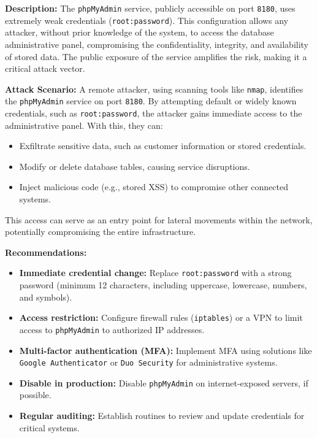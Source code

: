 \documentclass[a4paper,12pt]{article}
\begin{document}
\textbf{Description:}  
The \texttt{phpMyAdmin} service, publicly accessible on port \texttt{8180}, uses extremely weak credentials (\texttt{root:password}). This configuration allows any attacker, without prior knowledge of the system, to access the database administrative panel, compromising the confidentiality, integrity, and availability of stored data. The public exposure of the service amplifies the risk, making it a critical attack vector.

\textbf{Attack Scenario:}  
A remote attacker, using scanning tools like \texttt{nmap}, identifies the \texttt{phpMyAdmin} service on port \texttt{8180}. By attempting default or widely known credentials, such as \texttt{root:password}, the attacker gains immediate access to the administrative panel. With this, they can:  
\begin{itemize}
    \item Exfiltrate sensitive data, such as customer information or stored credentials.  
    \item Modify or delete database tables, causing service disruptions.  
    \item Inject malicious code (e.g., stored XSS) to compromise other connected systems.  
\end{itemize}
This access can serve as an entry point for lateral movements within the network, potentially compromising the entire infrastructure.

\textbf{Recommendations:}  
\begin{itemize}
    \item \textbf{Immediate credential change:} Replace \texttt{root:password} with a strong password (minimum 12 characters, including uppercase, lowercase, numbers, and symbols).  
    \item \textbf{Access restriction:} Configure firewall rules (\texttt{iptables}) or a VPN to limit access to \texttt{phpMyAdmin} to authorized IP addresses.  
    \item \textbf{Multi-factor authentication (MFA):} Implement MFA using solutions like \texttt{Google Authenticator} or \texttt{Duo Security} for administrative systems.  
    \item \textbf{Disable in production:} Disable \texttt{phpMyAdmin} on internet-exposed servers, if possible.  
    \item \textbf{Regular auditing:} Establish routines to review and update credentials for critical systems.  
\end{itemize}
\end{document}
